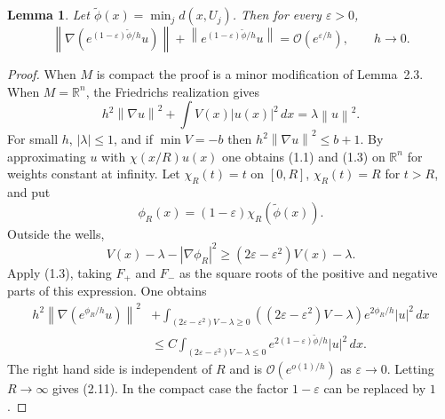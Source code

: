 \documentclass[11pt,a4paper]{article}
\newcommand{\R}{\mathbb R}
\newcommand{\cO}{\mathcal O}
\newcommand{\eps}{\varepsilon}
\newcommand{\norm}[1]{\left\lVert #1\right\rVert}
\numberwithin{equation}{section}
\newtheorem{lemma}[theorem]{Lemma}
\theoremstyle{remark}
\begin{document}
\begin{lemma}
Let $\widetilde\phi(x)=\min_j d(x,U_j)$. Then for every $\eps>0$,
\begin{equation}
\norm{\nabla(e^{(1-\eps)\widetilde\phi/h}u)}+
\norm{e^{(1-\eps)\widetilde\phi/h}u}=\cO(e^{\eps/h}),\qquad h\to0.
\end{equation}
\end{lemma}
\begin{proof}
When $M$ is compact the proof is a minor modification of Lemma~2.3. When $M=\R^n$, the Friedrichs realization gives
\[
h^2\norm{\nabla u}^2+\int V(x)|u(x)|^2\,dx=\lambda\norm u^2.
\]
For small $h$, $|\lambda|\le1$, and if $\min V=-b$ then $h^2\norm{\nabla u}^2\le b+1$. By approximating $u$ with $\chi(x/R)u(x)$ one obtains (1.1) and (1.3) on $\R^n$ for weights constant at infinity. Let $\chi_R(t)=t$ on $[0,R]$, $\chi_R(t)=R$ for $t>R$, and put
\[
\phi_R(x)=(1-\eps)\chi_R(\widetilde\phi(x)).
\]
Outside the wells,
\[
V(x)-\lambda-|\nabla\phi_R|^2\ge(2\eps-\eps^2)V(x)-\lambda.
\]
Apply (1.3), taking $F_+$ and $F_-$ as the square roots of the positive and negative parts of this expression. One obtains
\[
\begin{split}
h^2\norm{\nabla(e^{\phi_R/h}u)}^2
&+\int_{(2\eps-\eps^2)V-\lambda\ge0}
((2\eps-\eps^2)V-\lambda)e^{2\phi_R/h}|u|^2\,dx\\
&\le C\int_{(2\eps-\eps^2)V-\lambda\le0}
e^{2(1-\eps)\widetilde\phi/h}|u|^2\,dx.
\end{split}
\]
The right hand side is independent of $R$ and is $\cO(e^{o(1)/h})$ as $\eps\to0$. Letting $R\to\infty$ gives (2.11). In the compact case the factor $1-\eps$ can be replaced by $1$.
\end{proof}
\end{document}
